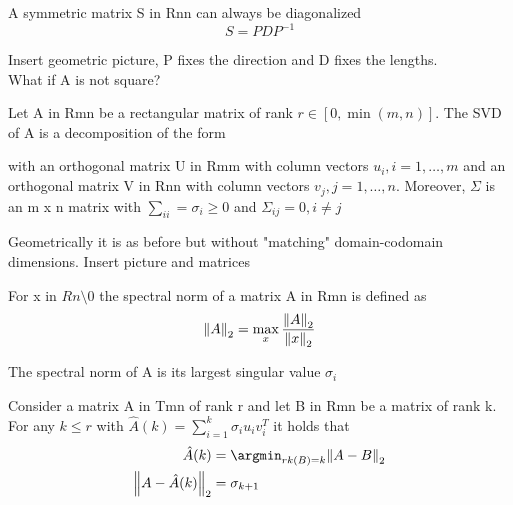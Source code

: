 \begin{theorem}
    A symmetric matrix S in Rnn can always be diagonalized
    \[ 
        S = PDP^{-1} 
    \]
\end{theorem}
Insert geometric picture, P fixes the direction and D fixes the lengths.\\
What if A is not square? 
\begin{theorem}
    Let A in Rmn be a rectangular matrix of rank $r \in [0,\min(m,n)]$. The SVD of A is a decomposition of the form

    with an orthogonal matrix U in Rmm with column vectors $u_i, i = 1, \ldots,m$ and an orthogonal matrix V in Rnn with column vectors $v_j, j = 1, \ldots,n$. Moreover, $\Sigma$ is an m x n matrix with $ \sum_{ii} = \sigma_i \geq 0$ and $\Sigma_{ij} = 0, i\neq j$ 
\end{theorem}
Geometrically it is as before but without "matching" domain-codomain dimensions. Insert picture and matrices 
\begin{definition}
    For x in $Rn \setminus {0}$ the spectral norm of a matrix A in Rmn is defined as 
    \[ 
        \left\lVert A\right\rVert_2 = \max_{x}{\frac{\left\lVert A\right\rVert_2}{\left\lVert x\right\rVert_2}} 
    \]
\end{definition}
\begin{theorem}
    The spectral norm of A is its largest singular value $\sigma_i$
\end{theorem}
\begin{theorem}
    Consider a matrix A in Tmn of rank r and let B in Rmn be a matrix of rank k. For any $k\leq r$ with $\hat{A}(k) = \sum_{i=1}^{k}{\sigma_iu_iv_i^T}$ it holds that
    \begin{align*}
        \hat{A}(k) &= \argmin_{rk(B)=k}{\norm{A-B}_2}\\
        \norm{A-\hat{A}(k)}_2 &= \sigma_{k+1}
    \end{align*}
\end{theorem}